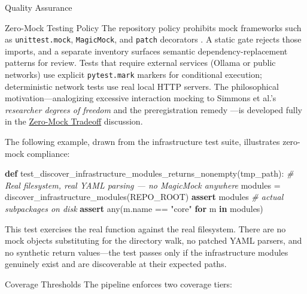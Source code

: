 \documentclass[
  ignorenonframetext,
]{beamer}
\author{\texorpdfstring{}{}}
\date{}
\newenvironment{Shaded}{}{}
\newcommand{\BuiltInTok}[1]{\textcolor[rgb]{0.00,0.50,0.00}{#1}}
\newcommand{\CommentTok}[1]{\textcolor[rgb]{0.38,0.63,0.69}{\textit{#1}}}
\newcommand{\ControlFlowTok}[1]{\textcolor[rgb]{0.00,0.44,0.13}{\textbf{#1}}}
\newcommand{\KeywordTok}[1]{\textcolor[rgb]{0.00,0.44,0.13}{\textbf{#1}}}
\newcommand{\NormalTok}[1]{#1}
\newcommand{\OperatorTok}[1]{\textcolor[rgb]{0.40,0.40,0.40}{#1}}
\newcommand{\StringTok}[1]{\textcolor[rgb]{0.25,0.44,0.63}{#1}}
\newcounter{none} %
\begin{document}
\begin{frame}{Quality Assurance}
\protect{}\label{quality-assurance}
\begin{block}{Zero-Mock Testing Policy}
\protect{}\label{zero-mock-testing-policy}
The repository policy prohibits mock frameworks such as
\texttt{unittest.mock}, \texttt{MagicMock}, and \texttt{patch}
decorators . A static gate
rejects those imports, and a separate inventory surfaces semantic
dependency-replacement patterns for review. Tests that require external
services (Ollama or public networks) use explicit \texttt{pytest.mark}
markers for conditional execution; deterministic network tests use real
local HTTP servers. The philosophical motivation---analogizing excessive
interaction mocking to Simmons et al.'s \emph{researcher degrees of
freedom}  and the preregistration remedy
---is developed fully in the
\href{05a_zeromock_tradeoff.md\#the-zero-mock-tradeoff}{Zero-Mock
Tradeoff} discussion.

The following example, drawn from the infrastructure test suite,
illustrates zero-mock compliance:

\begin{Shaded}
\begin{Highlighting}[]
\KeywordTok{def}\NormalTok{ test\_discover\_infrastructure\_modules\_returns\_nonempty(tmp\_path):}
    \CommentTok{\# Real filesystem, real YAML parsing — no MagicMock anywhere}
\NormalTok{    modules }\OperatorTok{=}\NormalTok{ discover\_infrastructure\_modules(REPO\_ROOT)}
    \ControlFlowTok{assert}\NormalTok{ modules                     }\CommentTok{\# actual subpackages on disk}
    \ControlFlowTok{assert} \BuiltInTok{any}\NormalTok{(m.name }\OperatorTok{==} \StringTok{"core"} \ControlFlowTok{for}\NormalTok{ m }\KeywordTok{in}\NormalTok{ modules)}
\end{Highlighting}
\end{Shaded}

This test exercises the real 
function against the real filesystem. There are no mock objects
substituting for the directory walk, no patched YAML parsers, and no
synthetic return values---the test passes only if the infrastructure
modules genuinely exist and are discoverable at their expected paths.
\end{block}

\begin{block}{Coverage Thresholds}
\protect{}\label{coverage-thresholds}
The pipeline enforces two coverage tiers:


\end{block}
\end{frame}
\end{document}
